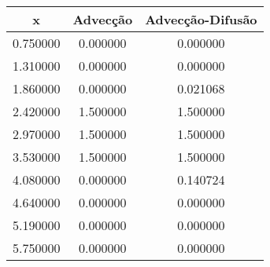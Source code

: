 \begin{tabular}{ccc}
\toprule
x & Advecção & Advecção-Difusão \\
\midrule
0.750000 & 0.000000 & 0.000000 \\
1.310000 & 0.000000 & 0.000000 \\
1.860000 & 0.000000 & 0.021068 \\
2.420000 & 1.500000 & 1.500000 \\
2.970000 & 1.500000 & 1.500000 \\
3.530000 & 1.500000 & 1.500000 \\
4.080000 & 0.000000 & 0.140724 \\
4.640000 & 0.000000 & 0.000000 \\
5.190000 & 0.000000 & 0.000000 \\
5.750000 & 0.000000 & 0.000000 \\
\bottomrule
\end{tabular}
